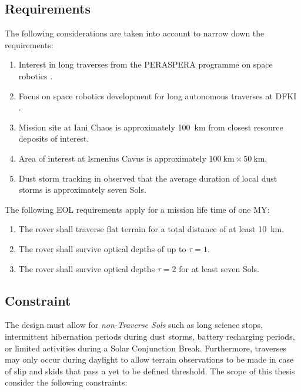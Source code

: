 \subsection{Requirements}
\label{sec:sec:Design:RequirementsAndDesignDrivers:Requirements}
The following considerations are taken into account to narrow down the requirements:

\begin{enumerate}[label=\textbf{\textcolor{BulletBlue}{(\alph*)}}]
    \item Interest in long traverses from the PERASPERA programme on space robotics .
    \item Focus on space robotics development for long autonomous traverses at \ac{DFKI}  .
    \item Mission site at Iani Chaos is approximately \SI{100}{\kilo\meter} from closest resource deposits of interest.
    \item Area of interest at Ismenius Cavus is approximately $\SI{100}{\kilo\meter} \times \SI{50}{\kilo\meter}$.
    \item Dust storm tracking in  observed that the average duration of local dust storms is approximately seven Sols.
\end{enumerate}

The following \ac{EOL} requirements apply for a mission life time of one \ac{MY}:

\begin{enumerate}[label=\textbf{\textcolor{BulletBlue}{R-\arabic*}}]
    \item \label{itm:req:total_distance_flat_terrain} The rover shall traverse flat terrain for a total distance of at least \SI{10}{\kilo\meter}.
    \item \label{itm:req:survive_tau1} The rover shall survive optical depths of up to $\tau = 1$.
    \item \label{itm:req:survice_tau2} The rover shall survive optical depths $\tau = 2$ for at least seven Sols.
\end{enumerate}

\subsection{Constraint}
\label{sec:Design:RequirementsAndDesignDrivers:Constraints}
The design must allow for \textit{non-Traverse Sols} such as long science stops, intermittent hibernation periods during dust storms, battery recharging periods, or limited activities during a Solar Conjunction Break. Furthermore, traverses may only occur during daylight to allow terrain observations to be made in case of slip and skids that pass a yet to be defined threshold. The scope of this thesis consider the following constraints:

